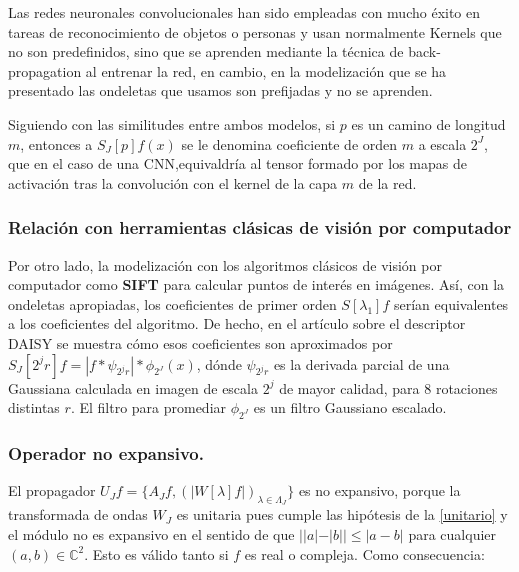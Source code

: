 \medskip

\noindent Las redes neuronales convolucionales han sido empleadas con mucho éxito en tareas de reconocimiento de objetos o personas y usan normalmente Kernels que no son predefinidos, sino que se aprenden mediante la técnica de back-propagation al entrenar la red, en cambio, en la modelización que se ha presentado las ondeletas que usamos son prefijadas y no se aprenden.

\medskip

\noindent Siguiendo con las similitudes entre ambos modelos, si $p$ es un camino de longitud $m$, entonces a $S_J[p] f(x)$ se le denomina coeficiente de orden $m$ a escala $2^J$, que en el caso de una CNN,equivaldría al tensor formado por los mapas de activación tras la convolución con el kernel de la capa $m$ de la red. 

\medskip


\subsubsection{Relación con herramientas clásicas de visión por computador}
\noindent Por otro lado, la modelización  con los algoritmos clásicos de visión por computador como \textbf{SIFT}  \cite{DistinctiveImageFeatures} para calcular puntos de interés en imágenes. Así, con la ondeletas apropiadas, los coeficientes de primer orden $S[\lambda_1] f$ serían equivalentes a los coeficientes del algoritmo. De hecho, en el artículo sobre el descriptor DAISY \cite{Daisy} se muestra cómo esos coeficientes son aproximados por $S_J[2^j r] f= | f \ast \psi_{2^j r} | \ast \phi_{2^J}(x)$, dónde $\psi_{2^j r}$ es la derivada parcial de una Gaussiana calculada en imagen de escala $2^j$ de mayor calidad, para 8 rotaciones distintas $r$. El filtro para promediar $\phi_{2^J}$ es un filtro Gaussiano escalado.


\subsubsection{Operador no expansivo.}

\noindent El propagador $U_Jf=\lbrace A_Jf, \left(\left| W[\lambda]f\right|\right)_{\lambda\in\Lambda_J} \rbrace$ es no expansivo, porque la transformada de ondas $W_J$ es unitaria pues cumple las hipótesis de la \autoref{unitario} y el módulo no es expansivo en el sentido de que $||a|-|b||\leq |a-b|$ para cualquier $(a,b)\in \mathbb{C}^2$. Esto es válido tanto si $f$ es real o compleja. Como consecuencia: 

